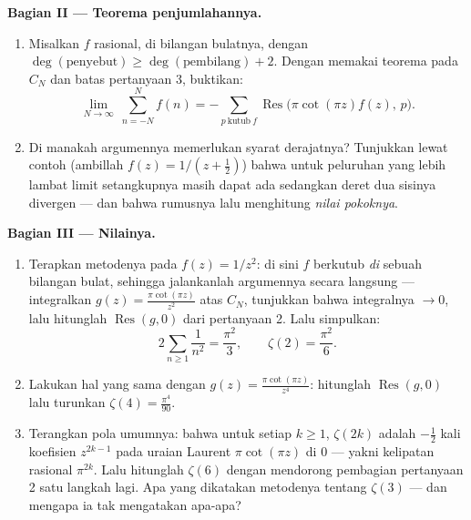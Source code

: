 \begin{problem}
\medskip
\noindent\textbf{Bagian II --- Teorema penjumlahannya.}
\begin{enumerate}[resume]
  \item Misalkan $f$ rasional,  di bilangan bulatnya,
        dengan $\deg(\text{penyebut}) \geq \deg(\text{pembilang}) + 2$.
        Dengan memakai teorema  pada $C_N$ dan batas
        pertanyaan 3, buktikan:
        \[
        \lim_{N\to\infty}\ \sum_{n = -N}^{N} f(n)
        = -\sum_{p\ \text{kutub}\ f}
        \operatorname{Res}\bigl(\pi\cot(\pi z)f(z),\,p\bigr).
        \]
  \item Di manakah argumennya memerlukan syarat derajatnya?
        Tunjukkan lewat contoh (ambillah $f(z) = 1/(z + \frac12)$)
        bahwa untuk peluruhan yang lebih lambat limit setangkupnya
        masih dapat ada sedangkan deret dua sisinya divergen
        --- dan bahwa rumusnya lalu menghitung
        \emph{nilai pokoknya}.
\end{enumerate}

\medskip
\noindent\textbf{Bagian III --- Nilainya.}
\begin{enumerate}[resume]
  \item Terapkan metodenya pada $f(z) = 1/z^2$: di sini $f$ berkutub
        \emph{di} sebuah bilangan bulat, sehingga jalankanlah argumennya
        secara langsung --- integralkan $g(z) = \frac{\pi\cot(\pi
        z)}{z^2}$ atas $C_N$, tunjukkan bahwa integralnya $\to 0$, lalu
        hitunglah $\operatorname{Res}(g, 0)$ dari pertanyaan 2.
        Lalu simpulkan:
        \[
        2\sum_{n\geq1}\frac1{n^2} = \frac{\pi^2}{3},
        \qquad \zeta(2) = \frac{\pi^2}6 .
        \]
  \item Lakukan hal yang sama dengan $g(z) = \frac{\pi\cot(\pi z)}{z^4}$:
        hitunglah $\operatorname{Res}(g, 0)$ lalu turunkan
        $\zeta(4) = \frac{\pi^4}{90}$.
  \item Terangkan pola umumnya: bahwa untuk setiap $k \geq 1$,
        $\zeta(2k)$ adalah $-\frac12$ kali koefisien
        $z^{2k-1}$ pada uraian Laurent $\pi\cot(\pi
        z)$ di $0$ --- yakni kelipatan rasional $\pi^{2k}$.
        Lalu hitunglah $\zeta(6)$ dengan mendorong pembagian pertanyaan 2
        satu langkah lagi. Apa yang dikatakan metodenya tentang
        $\zeta(3)$ --- dan mengapa ia tak mengatakan apa-apa?
\end{enumerate}


\end{problem}
